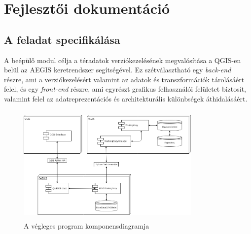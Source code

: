 \chapter{Fejlesztői dokumentáció}
\label{ch:impl}

\section{A feladat specifikálása}
A beépülő modul célja a téradatok verziókezelésének megvalósítása a QGIS-en belül az AEGIS keretrendszer segítségével. Ez szétválasztható egy \emph{back-end} részre, ami a verziókezelésért valamint az adatok és transzformációk tárolásáért felel, és egy \emph{front-end} részre, ami egyrészt grafikus felhasználói felületet biztosít, valamint felel az adatreprezentációs és architekturális különbségek áthidalásáért.

\begin{figure}[H]
	\centering
	\includegraphics[width=0.8\textwidth,height=220px]{images/qaegis_component_diagram.png}
	\caption{A végleges program komponensdiagramja}
	\label{fig:picture-7}
\end{figure}

